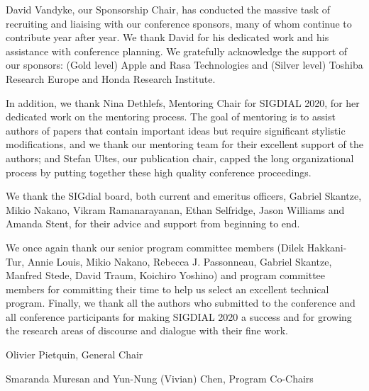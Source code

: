 \documentclass[11pt]{article}
\begin{document}
David Vandyke, our Sponsorship Chair, has conducted the massive task of recruiting and liaising with our conference sponsors, many of whom continue to contribute year after year. We thank David for his dedicated work and his assistance with conference planning. We gratefully acknowledge the support of our sponsors: (Gold level) Apple and Rasa Technologies and (Silver level) Toshiba Research Europe and Honda Research Institute. %

In addition, we thank Nina Dethlefs, Mentoring Chair for SIGDIAL 2020, for her dedicated work on the mentoring process. The goal of mentoring is to assist authors of papers that contain important ideas but require significant stylistic modifications, and we thank our mentoring team for their excellent support of the authors; and Stefan Ultes, our publication chair, capped the long organizational process by putting together these high quality conference proceedings.

We thank the SIGdial board, both current and emeritus officers, Gabriel Skantze, Mikio Nakano, Vikram Ramanarayanan, Ethan Selfridge, Jason Williams and Amanda Stent, for their advice and support from beginning to end.

We once again thank our senior program committee members (Dilek Hakkani-Tur,    Annie Louis, Mikio Nakano, Rebecca J. Passonneau, Gabriel Skantze,  Manfred Stede, David Traum, Koichiro Yoshino) and program committee members for committing their time to help us select an excellent technical program. Finally, we thank all the authors who submitted to the conference and all conference participants for making SIGDIAL 2020 a success and for growing the research areas of discourse and dialogue with their fine work.


Olivier Pietquin, General Chair

Smaranda Muresan and Yun-Nung (Vivian) Chen, Program Co-Chairs
\end{document}
